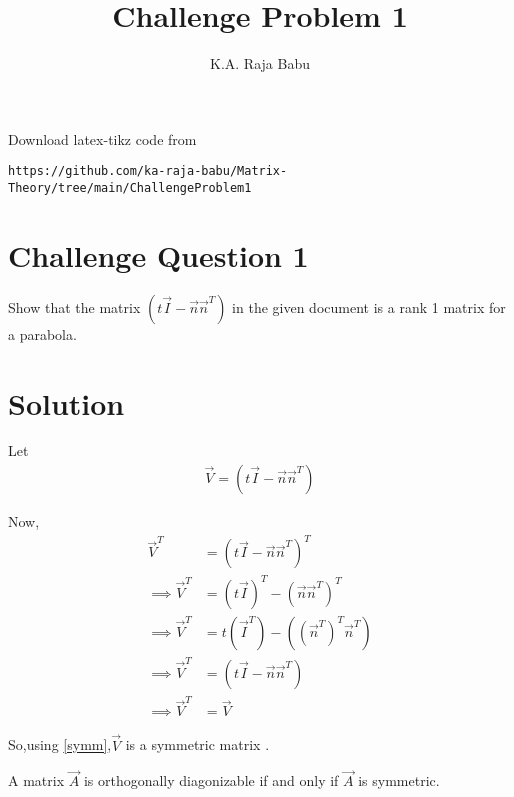 \documentclass[journal,12pt,twocolumn]{IEEEtran}
\begin{document}
     \def\rightbox#1{\makebox[0in][r]{#1}}
     \def\centbox#1{\makebox[0in]{#1}}
     \def\topbox#1{\raisebox{-\baselineskip}[0in][0in]{#1}}
     \def\midbox#1{\raisebox{-0.5\baselineskip}[0in][0in]{#1}}
\vspace{3cm}
\title{Challenge Problem 1}
\author{K.A. Raja Babu}
\maketitle
\newpage
\bigskip
\renewcommand{\thefigure}{\theenumi}
\renewcommand{\thetable}{\theenumi}
Download latex-tikz code from 
%
\begin{lstlisting}
https://github.com/ka-raja-babu/Matrix-Theory/tree/main/ChallengeProblem1
\end{lstlisting}
%
\section{Challenge Question 1}
Show that the matrix $(t\vec{I}-\vec{n}\vec{n}^T)$ in the given document is a rank 1 matrix for a parabola.
%
\section{Solution}
Let
\begin{align}
    \vec{V} = (t\vec{I}-\vec{n}\vec{n}^T) 
\end{align}

Now,
\begin{align}
    \vec{V}^T &= (t\vec{I}-\vec{n}\vec{n}^T)^T
    \\
    \implies \vec{V}^T &= (t\vec{I})^T-(\vec{n}\vec{n}^T)^T
    \\
    \implies \vec{V}^T &= t(\vec{I}^T) - ((\vec{n}^T)^T\vec{n}^T)
    \\
    \implies \vec{V}^T &= (t\vec{I}-\vec{n}\vec{n}^T)
    \\
    \implies \vec{V}^T &= \vec{V}    \label{symm}
\end{align}

So,using \eqref{symm},$\vec{V}$ is a symmetric matrix .

\begin{theorem}
\label{theorem1}
A matrix $\vec{A}$ is orthogonally diagonizable if and only if $\vec{A}$ is symmetric.
\end{theorem}
\end{document}
